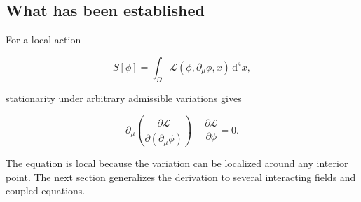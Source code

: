 \subsection{What has been established}

For a local action

\[
S[\phi]
=
\int_{\Omega}
\mathcal{L}(\phi,\partial_{\mu}\phi,x)
\,\mathrm{d}^{4}x,
\]

stationarity under arbitrary admissible variations gives

\[
\partial_{\mu}
\left(
\frac{\partial\mathcal{L}}
{\partial(\partial_{\mu}\phi)}
\right)
-
\frac{\partial\mathcal{L}}{\partial\phi}
=0.
\]

The equation is local because the variation can be localized around any interior point. The next section generalizes the derivation to several interacting fields and coupled equations.